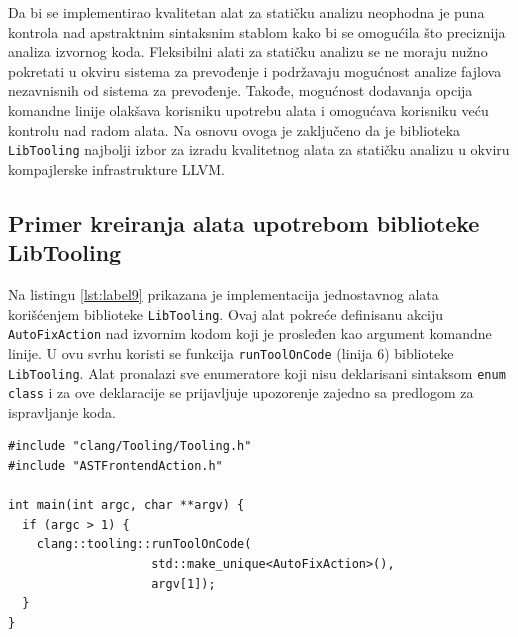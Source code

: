 \documentclass[12pt,oneside]{memoir}
\begin{document}
Da bi se implementirao kvalitetan alat za stati\v{c}ku analizu neophodna je puna kontrola nad apstraktnim sintaksnim stablom kako bi se omogu\'{c}ila \v{s}to preciznija analiza izvornog koda. Fleksibilni alati za stati\v{c}ku analizu se ne moraju nu\v{z}no pokretati u okviru sistema za prevođenje i podr\v{z}avaju mogu\'{c}nost analize fajlova nezavnisnih od sistema za prevođenje. Takođe, mogu\'{c}nost dodavanja opcija komandne linije olak\v{s}ava korisniku upotrebu alata i omogu\'{c}ava korisniku ve\'{c}u kontrolu nad radom alata. Na osnovu ovoga je zaklju\v{c}eno da je biblioteka \texttt{LibTooling} najbolji izbor za izradu kvalitetnog alata za stati\v{c}ku analizu u okviru kompajlerske infrastrukture LLVM.

\subsection{Primer kreiranja alata upotrebom biblioteke LibTooling}

Na listingu \ref{lst:label9} prikazana je implementacija jednostavnog alata kori\v{s}\'{c}enjem biblioteke \texttt{LibTooling}. Ovaj alat pokre\'{c}e definisanu akciju \texttt{AutoFixAction} nad izvornim kodom koji je prosleđen kao argument komandne linije. U ovu svrhu koristi se funkcija \texttt{runToolOnCode} (linija 6) biblioteke \texttt{LibTooling}. Alat pronalazi sve enumeratore koji nisu deklarisani sintaksom \texttt{enum class} i za ove deklaracije se prijavljuje upozorenje zajedno sa predlogom za ispravljanje koda. 

\begin{lstlisting}[style=customc,  caption={Primer implementacije jednostavnog alata upotrebom biblioteke \texttt{LibTooling}. Alat koristi klasu \texttt{AutoFixAction} sa listinga \ref{lst:ASTAction} dostupnom kroz zaglavlje \texttt{ASTFrontendAction.h}.}, label=lst:label9]
#include "clang/Tooling/Tooling.h"
#include "ASTFrontendAction.h"

int main(int argc, char **argv) {
  if (argc > 1) {
    clang::tooling::runToolOnCode(
                    std::make_unique<AutoFixAction>(),
                    argv[1]);
  }
}
\end{lstlisting}
\end{document}
